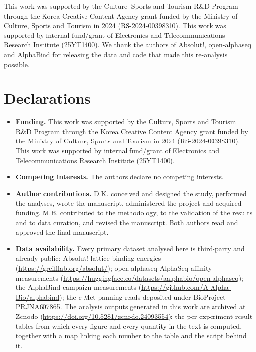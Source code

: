 \documentclass[pdflatex,sn-nature]{sn-jnl}
\theoremstyle{thmstyleone}
\theoremstyle{thmstyletwo}
\theoremstyle{thmstylethree}
\begin{document}

This work was supported by the Culture, Sports and
Tourism R\&D Program through the Korea Creative Content Agency grant funded by
the Ministry of Culture, Sports and Tourism in 2024 (RS-2024-00398310). This
work was supported by internal fund/grant of Electronics and
Telecommunications Research Institute (25YT1400). We thank the authors of
Absolut!, open-alphaseq and AlphaBind for releasing the data and code that
made this re-analysis possible.

\section*{Declarations}

\begin{itemize}
\item \textbf{Funding.} This work was supported by the Culture, Sports and
Tourism R\&D Program through the Korea Creative Content Agency grant funded by
the Ministry of Culture, Sports and Tourism in 2024 (RS-2024-00398310). This
work was supported by internal fund/grant of Electronics and
Telecommunications Research Institute (25YT1400).
\item \textbf{Competing interests.} The authors declare no competing interests.
\item \textbf{Author contributions.} D.K. conceived and designed the
study, performed the analyses, wrote the manuscript, administered the project
and acquired funding. M.B. contributed to the methodology, to the validation
of the results and to data curation, and revised the manuscript. Both authors
read and approved the final manuscript.
\item \textbf{Data availability.} Every primary dataset analysed here is
third-party and already public: Absolut! lattice binding energies
(\url{https://greifflab.org/absolut/}); open-alphaseq AlphaSeq affinity
measurements
(\url{https://huggingface.co/datasets/aalphabio/open-alphaseq}); the AlphaBind
campaign measurements (\url{https://github.com/A-Alpha-Bio/alphabind}); the
c-Met panning reads deposited under BioProject PRJNA607865. The analysis
outputs generated in this work are archived at Zenodo
\cite{libmatch2026} (\url{https://doi.org/10.5281/zenodo.24093554}): the per-experiment result tables
from which every figure and every quantity in the text is computed, together
with a map linking each number to the table and the script behind it.


\end{itemize}
\end{document}
